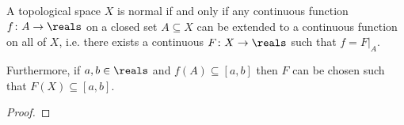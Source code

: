 \documentclass[article, a4paper, 11pt, oneside]{memoir}
\numberwithin{equation}{chapter}
\begin{document}
\begin{theorem}
    \label{thm:Tietze-extension}
    A topological space $X$ is normal if and only if any continuous function $f \colon A \to \reals$ on a closed set $A \subseteq X$ can be extended to a continuous function on all of $X$, i.e. there exists a continuous $F \colon X \to \reals$ such that $f = F|_A$.

    Furthermore, if $a,b \in \reals$ and $f(A) \subseteq [a,b]$ then $F$ can be chosen such that $F(X) \subseteq [a,b]$.
\end{theorem}

\begin{proof}
    
\end{proof}


\nocite{*}

\printbibliography
\end{document}
